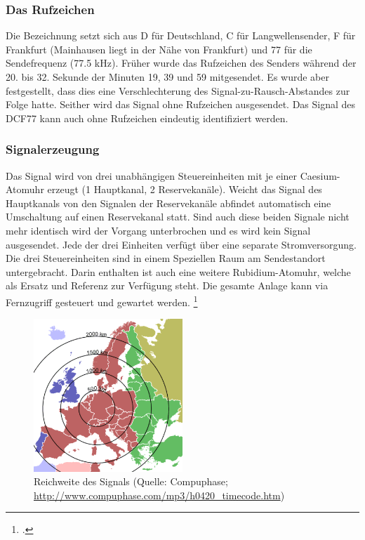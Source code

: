 \subsubsection{Das Rufzeichen}
Die Bezeichnung setzt sich aus D für Deutschland, C für Langwellensender, F für Frankfurt (Mainhausen liegt in der Nähe von Frankfurt) und 77 für die Sendefrequenz (77.5 kHz). Früher wurde das Rufzeichen des Senders während der 20. bis 32. Sekunde der Minuten 19, 39 und 59 mitgesendet. Es wurde aber festgestellt, dass dies eine Verschlechterung des Signal-zu-Rausch-Abstandes zur Folge hatte. Seither wird das Signal ohne Rufzeichen ausgesendet. Das Signal des DCF77 kann auch ohne Rufzeichen eindeutig identifiziert werden.

\subsubsection{Signalerzeugung}
Das Signal wird von drei unabhängigen Steuereinheiten mit je einer Caesium-Atomuhr erzeugt (1 Hauptkanal, 2 Reservekanäle). Weicht das Signal des Hauptkanals von den Signalen der Reservekanäle abfindet automatisch eine Umschaltung auf einen Reservekanal statt. Sind auch diese beiden Signale nicht mehr identisch wird der Vorgang unterbrochen und es wird kein Signal ausgesendet. Jede der drei Einheiten verfügt über eine separate Stromversorgung. Die drei Steuereinheiten sind in einem Speziellen Raum am Sendestandort untergebracht. Darin enthalten ist auch eine weitere Rubidium-Atomuhr, welche als Ersatz und Referenz zur Verfügung steht. Die gesamte Anlage kann via Fernzugriff gesteuert und gewartet werden. \footcite{hopfDCF_GPS}

\begin{figure}
  \vspace{-20pt}
  \centering
    \includegraphics[width=0.5\textwidth]{./images/Analyse/DCF77_Reichweite.png}
  \caption[Reichweite des Signals]{Reichweite des Signals (Quelle: Compuphase; 
  \url{http://www.compuphase.com/mp3/h0420_timecode.htm})} 
\end{figure}

